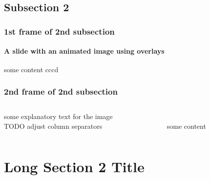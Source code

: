 \documentclass[german,aspectratio=169,notoc,titlestyle=tud,draft]{tudbeamer}%
\begin{document}
\subsection{Subsection 2}
\begin{frame}
	\frametitle{1st frame of 2nd subsection}
	\framesubtitle{A slide with an animated image using overlays}
	\centering
some content
cccd
\end{frame}

\begin{frame}
	\frametitle{2nd frame of 2nd subsection}
	\begin{columns}[t]
		\begin{column}{.2\textwidth}
			some explanatory text for the image\\
			TODO adjust column separators
		\end{column}
	   	\begin{column}{.80\textwidth}
	   		\ \\[-2ex]
	   		some content
		\end{column}
	\end{columns}
\end{frame}

\section[ShortSection2]{Long Section 2 Title}
\end{document}
